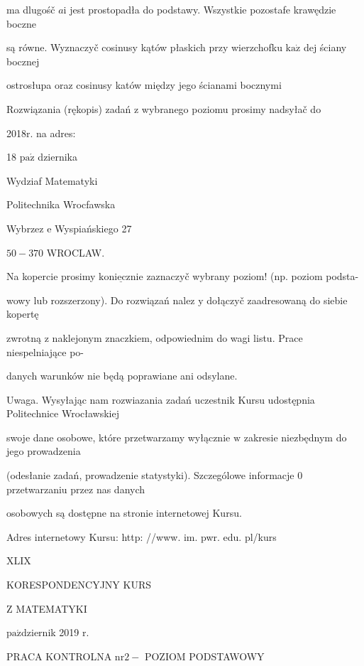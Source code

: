 \documentclass[a4paper,12pt]{article}
\begin{document}
ma dlugośč $a\mathrm{i}$ jest prostopadła do podstawy. Wszystkie pozostafe krawędzie boczne

są równe. Wyznaczyč cosinusy kątów płaskich przy wierzchofku $\mathrm{k}\mathrm{a}\dot{\mathrm{z}}$ dej ściany bocznej

ostrosłupa oraz cosinusy katów między jego ścianami bocznymi

Rozwiązania (rękopis) zadań z wybranego poziomu prosimy nadsyłač do

2018r. na adres:

18 $\mathrm{p}\mathrm{a}\acute{\mathrm{z}}$ dziernika

Wydziaf Matematyki

Politechnika Wrocfawska

Wybrzez $\mathrm{e}$ Wyspiańskiego 27

$50-370$ WROCLAW.

Na kopercie prosimy $\underline{\mathrm{k}\mathrm{o}\mathrm{n}\mathrm{i}\mathrm{e}\mathrm{c}\mathrm{z}\mathrm{n}\mathrm{i}\mathrm{e}}$ zaznaczyč wybrany poziom! (np. poziom podsta-

wowy lub rozszerzony). Do rozwiązań nalez $\mathrm{y}$ dołączyč zaadresowaną do siebie kopertę

zwrotną $\mathrm{z}$ naklejonym znaczkiem, odpowiednim do wagi listu. Prace niespelniające po-

danych warunków nie będą poprawiane ani odsylane.

Uwaga. Wysyłając nam rozwiazania zadań uczestnik Kursu udostępnia Politechnice Wrocławskiej

swoje dane osobowe, które przetwarzamy wyłącznie $\mathrm{w}$ zakresie niezbędnym do jego prowadzenia

(odesłanie zadań, prowadzenie statystyki). Szczególowe informacje $0$ przetwarzaniu przez nas danych

osobowych są dostępne na stronie internetowej Kursu.

Adres internetowy Kursu: http: //www. im. pwr. edu. pl/kurs







XLIX

KORESPONDENCYJNY KURS

Z MATEMATYKI

$\mathrm{p}\mathrm{a}\acute{\mathrm{z}}$dziernik 2019 $\mathrm{r}.$

PRACA KONTROLNA $\mathrm{n}\mathrm{r} 2-$ POZIOM PODSTAWOWY
\end{document}
